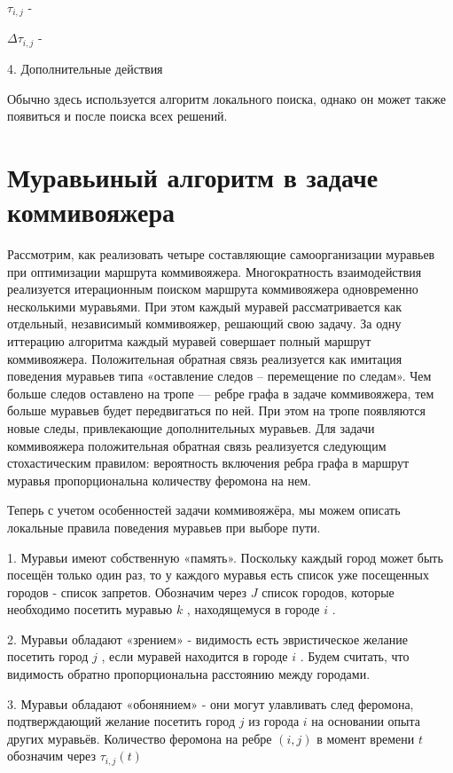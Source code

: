 \documentclass[12pt]{report}
\begin{document}
$\tau _{i,j}$ -  

$\Delta \tau _{i,j}$ - 

4. Дополнительные действия 

Обычно здесь используется алгоритм локального поиска, однако    он может также появиться и после поиска всех решений. 

\section{Муравьиный алгоритм в задаче коммивояжера}
Рассмотрим, как реализовать четыре составляющие самоорганизации муравьев при оптимизации маршрута коммивояжера. Многократность взаимодействия реализуется итерационным поиском маршрута коммивояжера одновременно несколькими муравьями. При этом каждый муравей рассматривается как отдельный, независимый коммивояжер, решающий свою задачу. За одну иттерацию алгоритма каждый муравей совершает полный маршрут коммивояжера. Положительная обратная связь реализуется как имитация поведения муравьев типа «оставление следов – перемещение по следам». Чем больше следов оставлено на тропе — ребре графа в задаче коммивояжера, тем больше муравьев будет передвигаться по ней. При этом на тропе появляются новые следы, привлекающие дополнительных муравьев. Для задачи коммивояжера положительная обратная связь реализуется следующим стохастическим правилом: вероятность включения ребра графа в маршрут муравья пропорциональна количеству феромона на нем.

Теперь с учетом особенностей задачи коммивояжёра, мы можем описать локальные правила поведения муравьев при выборе пути.\

1. Муравьи имеют собственную «память». Поскольку каждый город может быть посещён только один раз, то у каждого муравья есть список уже посещенных городов - список запретов. Обозначим через $J$ список городов, которые необходимо посетить муравью $k$ , находящемуся в городе $i$ . 

2. Муравьи обладают «зрением» - видимость есть эвристическое желание посетить город $j$ , если муравей находится в городе $i$ . Будем считать, что видимость обратно пропорциональна расстоянию между городами. 

3. Муравьи обладают «обонянием» - они могут улавливать след феромона, подтверждающий желание посетить город $j$ из города $i$ на основании опыта других муравьёв. Количество феромона на ребре $(i,j)$ в момент времени $t$ обозначим через  $\tau _{i,j} (t)$ 
\end{document}
